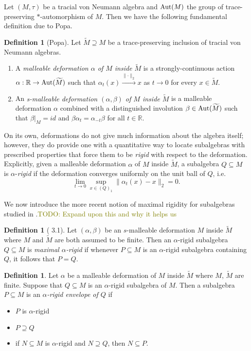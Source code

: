 \documentclass[a4paper,11pt]{article}
\numberwithin{equation}{section}
\theoremstyle{definition}
\newtheorem{defn}[thm]{Definition}
\theoremstyle{remark}
\numberwithin{equation}{section}
\def\R{\mathbb{R}}
\newcommand{\Aut}{{\rm Aut}}
\def\sub{\subseteq}
\providecommand{\norm}[1]{\lVert#1\rVert}
\numberwithin{equation}{section}
\begin{document}
Let $ (M,\tau) $ be a tracial von Neumann algebra and $ \Aut(M) $ the group of trace-preserving $ * $-automorphism of $ M $. Then we have the following fundamental definition due to Popa.

\begin{defn}[Popa]
  Let $ \widetilde{M}\supseteq M $ be a trace-preserving inclusion of tracial von Neumann algebras.
  \begin{enumerate}
    \item A \textit{malleable deformation $ \alpha $ of $ M $ inside $ \widetilde{M} $} is a strongly-continuous action $ \alpha:\R\to \Aut(\widetilde{M}) $ such that $ \alpha_{t}(x)\xrightarrow{\norm{\cdot}_{2}}x $ as $ t\to 0 $ for every $ x\in \widetilde{M} $.
    \item An \textit{s-malleable deformation $ (\alpha,\beta) $ of $ M $ inside $ \widetilde{M} $ } is a malleable deformation $ \alpha $ combined with a distinguished involution $ \beta\in\Aut(\widetilde{M}) $ such that $ \beta\vert_{M} = id $ and $ \beta \alpha_{t} = \alpha_{-t} \beta $ for all $ t\in \R $.
  \end{enumerate}
\end{defn}


On its own, deformations do not give much information about the algebra itself; however, they do provide one with a quantitative way to locate subalgebras with prescribed properties that force them to be \textit{rigid} with respect to the deformation. Explicitly, given a malleable deformation $ \alpha $ of $ M $ inside $ \widetilde{M} $, a subalgebra $ Q\sub M $ is $ \alpha $-\textit{rigid} if the deformation converges uniformly on the unit ball of $ Q $, i.e.
$$
  \lim_{t\to 0}\sup_{x\in (Q)_{1}} \norm{\alpha_{t}(x)-x}_{2} =0.
$$

We now introduce the more recent notion of maximal rigidity for subalgebras studied in \textcite{dSHH:21}.\textcolor{olive}{TODO: Expand upon this and why it helps us}

\begin{defn}[\textcite{dSHH:21} 3.1]
  Let $ (\alpha,\beta) $ be an $ s $-malleable deformation $ M $ inside $ \widetilde{M} $ where $ M $ and $ \widetilde{M} $ are both assumed to be finite. Then an $ \alpha $-rigid subalgebra $ Q\sub M $ is \textit{maximal $ \alpha $-rigid} if whenever $ P\sub M $ is an $ \alpha $-rigid subalgebra containing $ Q $, it follows that $ P = Q $.
\end{defn}


\begin{defn}
  Let $ \alpha $ be a malleable deformation of $ M $ inside $ \widetilde{M} $ where $ M$, $\widetilde{M} $ are finite. Suppose that $ Q\sub M $ is an $ \alpha $-rigid subalgebra of $ M $. Then a subalgebra $ P\sub M $ is an \textit{$\alpha$-rigid envelope of $ Q $} if 
  \begin{itemize}
    \item $ P $ is $ \alpha $-rigid
    \item $ P\supseteq Q $
    \item if $ N \sub M $ is $ \alpha $-rigid and $ N\supseteq Q $, then $ N\sub P $.
  \end{itemize}
\end{defn}
\end{document}
